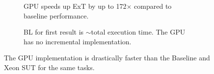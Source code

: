 \begin{figure}[htbp]
    \centering
    \begin{subfigure}[b]{0.45\textwidth}  %
        \centering
        
        \caption{\acs{GPU} speeds up \acl{ExT} by up to 172$\times$ compared to baseline performance.}
        \label{Figure:exec-time}
    \end{subfigure}
    \hfill
    \begin{subfigure}[b]{0.45\textwidth}  %
        \centering
        \caption{{\acl{BL}} for first result is $\sim$total execution time. The \acs{GPU} has no incremental implementation.}
        \label{Figure:batch-latency}
    \end{subfigure}
    \caption{The \acs{GPU} implementation is drastically faster than the Baseline and Xeon \acs{SUT} for the same tasks.}
    \label{Figure:cd-results-efficency-time}

\end{figure}